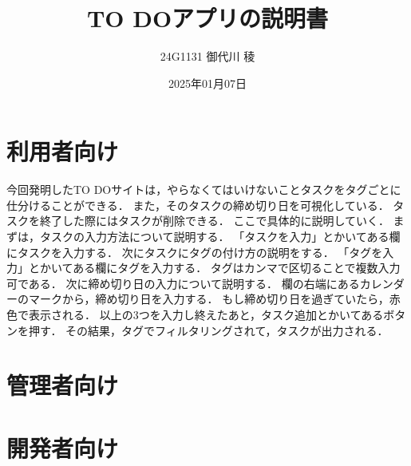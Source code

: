 \documentclass[uplatex,dvipdfmx]{jsarticle}
\begin{document}
\title{TO DOアプリの説明書}
\author{24G1131 御代川 稜}
\date{2025年01月07日}
\maketitle
\rmfamily\mcfamily %

\section{利用者向け}
今回発明したTO DOサイトは，やらなくてはいけないことタスクをタグごとに仕分けることができる．
また，そのタスクの締め切り日を可視化している．
タスクを終了した際にはタスクが削除できる．
ここで具体的に説明していく．
まずは，タスクの入力方法について説明する．
「タスクを入力」とかいてある欄にタスクを入力する．
次にタスクにタグの付け方の説明をする．
「タグを入力」とかいてある欄にタグを入力する．
タグはカンマで区切ることで複数入力可である．
次に締め切り日の入力について説明する．
欄の右端にあるカレンダーのマークから，締め切り日を入力する．
もし締め切り日を過ぎていたら，赤色で表示される．
以上の3つを入力し終えたあと，タスク追加とかいてあるボタンを押す．
その結果，タグでフィルタリングされて，タスクが出力される．

\section{管理者向け}

\section{開発者向け}


\end{document}
